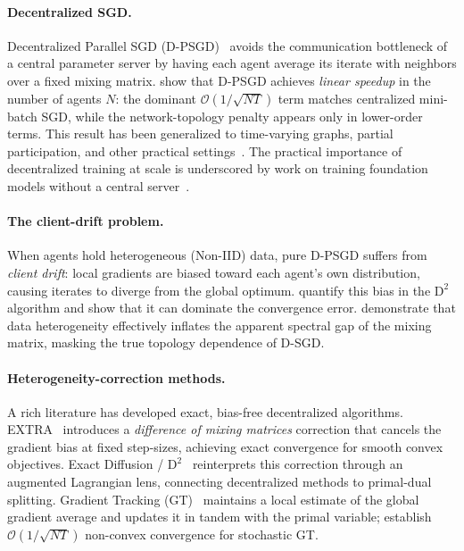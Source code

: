 \paragraph{Decentralized SGD.}
Decentralized Parallel SGD (D-PSGD)~\citep{lian2017can} avoids the
communication bottleneck of a central parameter server by having each agent
average its iterate with neighbors over a fixed mixing matrix.
\citet{lian2017can} show that D-PSGD achieves \emph{linear speedup} in the
number of agents $N$: the dominant $\mathcal{O}(1/\sqrt{NT})$ term matches
centralized mini-batch SGD, while the network-topology penalty appears only in
lower-order terms.  This result has been generalized to time-varying graphs,
partial participation, and other practical settings~\citep{koloskova2020unified}.
The practical importance of decentralized training at scale is underscored by
work on training foundation models without a central
server~\citep{yuan2022decentralized}.

\paragraph{The client-drift problem.}
When agents hold heterogeneous (Non-IID) data, pure D-PSGD suffers from
\emph{client drift}: local gradients are biased toward each agent's own
distribution, causing iterates to diverge from the global optimum.
\citet{tang2018d2} quantify this bias in the $\mathrm{D}^2$ algorithm and show
that it can dominate the convergence error.
\citet{yuan2021removing} demonstrate that data heterogeneity effectively
inflates the apparent spectral gap of the mixing matrix, masking the true
topology dependence of D-SGD.

\paragraph{Heterogeneity-correction methods.}
A rich literature has developed exact, bias-free decentralized algorithms.
EXTRA~\citep{shi2015extra} introduces a \emph{difference of mixing matrices}
correction that cancels the gradient bias at fixed step-sizes, achieving exact
convergence for smooth convex objectives.
Exact Diffusion / $\mathrm{D}^2$~\citep{tang2018d2} reinterprets this
correction through an augmented Lagrangian lens, connecting decentralized
methods to primal-dual splitting.
Gradient Tracking (GT)~\citep{pu2020distributed} maintains a local estimate of
the global gradient average and updates it in tandem with the primal variable;
\citet{xin2020improved} establish $\mathcal{O}(1/\sqrt{NT})$ non-convex
convergence for stochastic GT.

